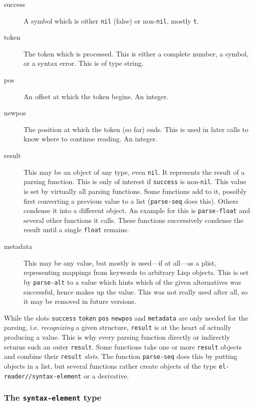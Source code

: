 \documentclass[a4paper,10pt,twoside]{report}
\newcommand{\sym}[1]{\texttt{#1}}
\newcommand{\fun}[1]{\texttt{#1}}
\newcommand{\nil}{\sym{nil}}
\newcommand{\tee}{\sym{t}}
\begin{document}
\begin{description}
\item[success] A symbol which is either \nil{} (false) or non-\nil{}, mostly
  \tee{}.
\item[token] The token which is processed.  This is either a complete number, a
  symbol, or a syntax error.  This is of type string.
\item[pos] An offset at which the token begins.  An integer.
\item[newpos] The position at which the token (so far) ends.  This is used in
  later calls to know where to continue reading.  An integer.
\item[result] This may be an object of any type, even \nil{}.  It represents the
  result of a parsing function.  This is only of interest if \sym{success} is
  non-\nil{}.  This value is set by virtually all parsing functions.  Some
  functions add to it, possibly first converting a previous value to a list
  (\fun{parse-seq} does this).  Others condense it into a different object.  An
  example for this is \fun{parse-float} and several other functions it calls.
  These functions successively condense the result until a single \sym{float}
  remains.
\item[metadata] This may be any value, but mostly is used---if at all---as a
  plist, representing mappings from keywords to arbitrary Lisp objects.  This is
  set by \fun{parse-alt} to a value which hints which of the given alternatives
  was successful, hence makes up the value.  This was not really used after
  all, so it may be removed in future versions.
\end{description}

While the slots \sym{success} \sym{token} \sym{pos} \sym{newpos} and
\sym{metadata} are only needed for the parsing, i.e. \emph{recognizing} a given
structure, \sym{result} is at the heart of actually producing a value.  This is
why every parsing function directly or indirectly returns such an outer
\sym{result}.  Some functions take one or more \sym{result} objects
and combine their \sym{result} \emph{slots}.  The function \fun{parse-seq} does
this by putting objects in a list, but several functions rather create objects
of the type \sym{el-reader//syntax-element} or a derivative.

\subsubsection{The \sym{syntax-element} type}
\label{subsubsec:syntax-element}
\end{document}
